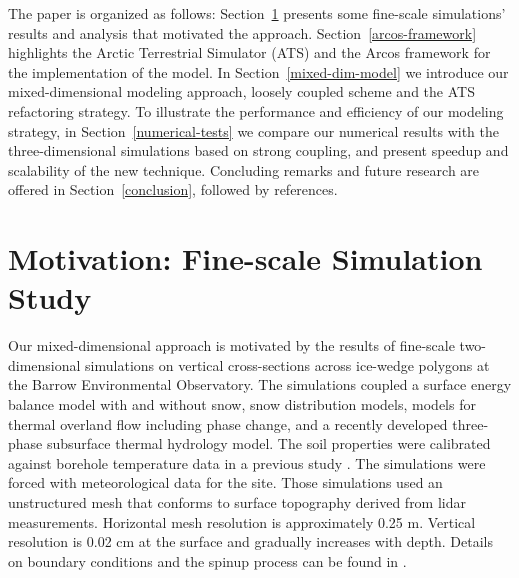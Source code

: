 \documentclass[review]{elsarticle}
\begin{document}
The paper is organized as follows: Section~\ref{motivation} presents some fine-scale simulations' results and analysis that motivated the approach. Section~\ref{arcos-framework} highlights the Arctic Terrestrial Simulator (ATS) and the Arcos framework for the implementation of the model. In Section~\ref{mixed-dim-model} we introduce our mixed-dimensional modeling approach, loosely coupled scheme and the ATS refactoring strategy. To illustrate the performance and efficiency of our modeling strategy, in Section~\ref{numerical-tests} we compare our numerical results with the three-dimensional simulations based on strong coupling, and present speedup and scalability of the new technique. Concluding remarks and future research are offered in Section~\ref{conclusion}, followed by references.


\section{Motivation: Fine-scale Simulation Study}\label{motivation}

Our mixed-dimensional approach is motivated by the results of fine-scale two-dimensional simulations on vertical cross-sections across ice-wedge polygons at the Barrow Environmental Observatory. The simulations coupled a surface energy balance model with and without snow, snow distribution models, models for thermal overland flow including phase change, and a recently developed three-phase subsurface thermal hydrology model. The soil properties were calibrated against borehole temperature data in a previous study \cite{atchley2015}. The simulations were forced with meteorological data for the site. Those simulations used an unstructured mesh that conforms to surface topography derived from lidar measurements. Horizontal mesh resolution is approximately 0.25 m. Vertical resolution is 0.02 cm at the surface and gradually increases with depth. Details on boundary conditions and the spinup process can be found in \cite{spainter2016integrated}. 
\end{document}
